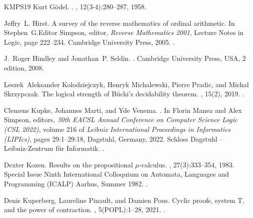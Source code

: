 \documentclass[10pt,a4paper]{amsart}
\theoremstyle{plain}
\theoremstyle{definition}
\theoremstyle{plain}
\theoremstyle{definition} %
\begin{document}
\begin{thebibliography}{KMPS19}
Kurt Gödel.
.
, 12(3-4):280--287, 1958.

Jeffry~L. Hirst.
\newblock A survey of the reverse mathematics of ordinal arithmetic.
\newblock In Stephen~G.Editor Simpson, editor, {\em Reverse Mathematics 2001}, Lecture Notes in Logic, page 222–234. Cambridge University Press, 2005.
\newblock \href {https://doi.org/10.1017/9781316755846.014} {}.

J.~Roger Hindley and Jonathan~P. Seldin.
.
\newblock Cambridge University Press, USA, 2 edition, 2008.

Leszek~Aleksander Kolodziejczyk, Henryk Michalewski, Pierre Pradic, and Michal Skrzypczak.
\newblock The logical strength of {B}{\"{u}}chi's decidability theorem.
, 15(2), 2019.
\newblock \href {https://doi.org/10.23638/LMCS-15(2:16)2019} {}.

Clemens Kupke, Johannes Marti, and Yde Venema.
.
\newblock In Florin Manea and Alex Simpson, editors, {\em 30th EACSL Annual Conference on Computer Science Logic (CSL 2022)}, volume 216 of {\em Leibniz International Proceedings in Informatics (LIPIcs)}, pages 29:1--29:18, Dagstuhl, Germany, 2022. Schloss Dagstuhl -- Leibniz-Zentrum f{\"u}r Informatik.
\newblock \href {https://doi.org/10.4230/LIPIcs.CSL.2022.29} {}.

Dexter Kozen.
\newblock Results on the propositional $\mu$-calculus.
, 27(3):333--354, 1983.
\newblock Special Issue Ninth International Colloquium on Automata, Languages and Programming (ICALP) Aarhus, Summer 1982.
\newblock \href {https://doi.org/10.1016/0304-3975(82)90125-6} {}.

Denis Kuperberg, Laureline Pinault, and Damien Pous.
\newblock Cyclic proofs, system {T}, and the power of contraction.
, 5({POPL}):1--28, 2021.
\newblock \href {https://doi.org/10.1145/3434282} {}.


\end{thebibliography}
\end{document}
